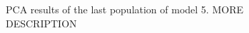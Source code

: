 \begin{figure}[H]
    \begin{center}
    \end{center}

    \caption[TODO]{PCA results of the last population of model 5. MORE DESCRIPTION}
    \label{fig:pc}
\end{figure}

